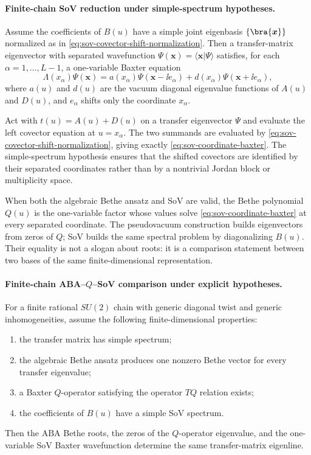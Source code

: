 \paragraph{Finite-chain SoV reduction under simple-spectrum hypotheses.}
Assume the coefficients of \(B(u)\) have a simple joint eigenbasis
\(\{\bra{\boldsymbol x}\}\) normalized as in
\eqref{eq:sov-covector-shift-normalization}.  Then a transfer-matrix
eigenvector with separated wavefunction
\(\Psi(\boldsymbol x)=\langle\boldsymbol x|\Psi\rangle\) satisfies, for each
\(\alpha=1,\ldots,L-1\), a one-variable Baxter equation
\begin{equation}
  \Lambda(x_\alpha)\Psi(\boldsymbol x)
  =
  a(x_\alpha)\Psi(\boldsymbol x-\ii e_\alpha)
  +
  d(x_\alpha)\Psi(\boldsymbol x+\ii e_\alpha),
  \label{eq:sov-coordinate-baxter}
\end{equation}
where \(a(u)\) and \(d(u)\) are the vacuum diagonal eigenvalue functions of
\(A(u)\) and \(D(u)\), and \(e_\alpha\) shifts only the coordinate
\(x_\alpha\).

Act with \(t(u)=A(u)+D(u)\) on a transfer eigenvector \(\Psi\) and evaluate
the left covector equation at \(u=x_\alpha\).  The two summands are evaluated
by \eqref{eq:sov-covector-shift-normalization}, giving exactly
\eqref{eq:sov-coordinate-baxter}.  The simple-spectrum hypothesis ensures
that the shifted covectors are identified by their separated coordinates
rather than by a nontrivial Jordan block or multiplicity space.

When both the algebraic Bethe ansatz and SoV are valid, the Bethe polynomial
\(Q(u)\) is the one-variable factor whose values solve
\eqref{eq:sov-coordinate-baxter} at every separated coordinate.  The
pseudovacuum construction builds eigenvectors from zeros of \(Q\); SoV builds
the same spectral problem by diagonalizing \(B(u)\).  Their equality is not a
slogan about roots: it is a comparison statement between two bases of the same
finite-dimensional representation.

\paragraph{Finite-chain ABA--\(Q\)--SoV comparison under explicit hypotheses.}
For a finite rational \(SU(2)\) chain with generic diagonal twist and generic
inhomogeneities, assume the following finite-dimensional properties:
\begin{enumerate}
\item the transfer matrix has simple spectrum;
\item the algebraic Bethe ansatz produces one nonzero Bethe vector for every
transfer eigenvalue;
\item a Baxter \(Q\)-operator satisfying the operator \(TQ\) relation exists;
\item the coefficients of \(B(u)\) have a simple SoV spectrum.
\end{enumerate}
Then the ABA Bethe roots, the zeros of the \(Q\)-operator eigenvalue, and the
one-variable SoV Baxter wavefunction determine the same transfer-matrix
eigenline.


